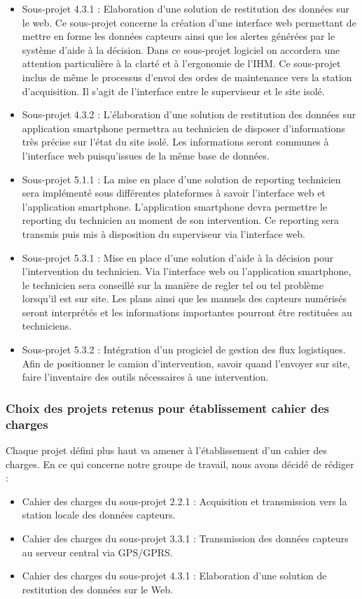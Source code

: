 \begin{itemize}
\item Sous-projet 4.3.1 : Elaboration d'une solution de restitution des données sur le web. Ce sous-projet concerne la création d'une interface web permettant de mettre en forme les données capteurs ainsi que les alertes générées par le système d'aide à la décision. Dans ce sous-projet logiciel on accordera une attention particulière à la clarté et à l'ergonomie de l'IHM. Ce sous-projet inclus de même le processus d'envoi des ordes de maintenance vers la station d'acquisition. Il s'agit de l'interface entre le superviseur et le site isolé.
\item Sous-projet 4.3.2 : L'élaboration d'une solution de restitution des données sur application smartphone permettra au technicien de disposer d'informations très précise sur l'état du site isolé. Les informations seront communes à l'interface web puisqu'issues de la même base de données.
\item Sous-projet 5.1.1 : La mise en place d'une solution de reporting technicien sera implémenté sous différentes plateformes à savoir l'interface web et l'application smartphone. L'application smartphone devra permettre le reporting du technicien au moment de son intervention. Ce reporting sera transmis puis mis à disposition du superviseur via l'interface web.
\item Sous-projet 5.3.1 : Mise en place d'une solution d'aide à la décision pour l'intervention du technicien. Via l'interface web ou l'application smartphone, le technicien sera conseillé sur la manière de regler tel ou tel problème lorsqu'il est sur site. Les plans ainsi que les manuels des capteurs numérisés seront interprétés et les informations importantes pourront être restituées au techniciens.
\item Sous-projet 5.3.2 : Intégration d'un progiciel de gestion des flux logistiques. Afin de positionner le camion d'intervention, savoir quand l'envoyer sur site, faire l'inventaire des outils nécessaires à une intervention.
\end{itemize}


\subsubsection{Choix des projets retenus pour établissement cahier des charges}
Chaque projet défini plus haut va amener à l'établissement d'un cahier des charges. En ce qui concerne notre groupe de travail, nous avons décidé de rédiger :

\begin{itemize}
\item Cahier des charges du sous-projet 2.2.1 : Acquisition et transmission vers la station locale des données capteurs.
\item Cahier des charges du sous-projet 3.3.1 : Transmission des données capteurs au serveur central via GPS/GPRS.
\item Cahier des charges du sous-projet 4.3.1 : Elaboration d'une solution de restitution des données sur le Web.
\end{itemize}

